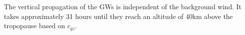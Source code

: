 The vertical propagation of the GWs is independent of the background wind. It takes approximately 31 hours until they reach an altitude of 40km above the tropopause based on $c_{gz}$.


